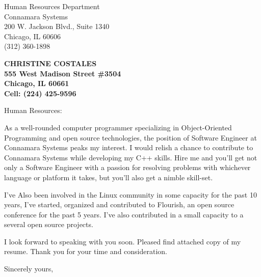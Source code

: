 \documentclass[11pt]{letter} %
\newcommand{\addressee}{Human Resources Department }
\newcommand{\companyName}{Connamara Systems }
\newcommand{\position}{Software Engineer  }
\newcommand{\companyAddress}{ 200 W. Jackson Blvd., Suite 1340 \\
Chicago, IL 60606 \\
(312) 360-1898  }
\newcommand{\myname}{Christine Costales }
\begin{document}
\signature{\myname}                     %
\longindentation=0pt                       %
\let\raggedleft\raggedright                %
 
\begin{letter}{\addressee \\
\companyName \\
\companyAddress
 }

\begin{center}
\large\bf CHRISTINE COSTALES\\
555 West Madison Street \#3504 \\ Chicago, IL 60661 \\ Cell: (224) 425-9596
\end{center} 
\vfill %



\opening{Human Resources:\newline } 


\noindent As a well-rounded computer programmer specializing in Object-Oriented Programming and open source technologies, the position of \position at \companyName peaks my interest. I would relish a chance to contribute to \companyName while developing my C++ skills. Hire me and you’ll get not only a \position with a passion for resolving problems with whichever language or platform it takes, but you’ll also get a nimble skill-set.  \newline


\noindent I've Also been involved in the Linux community in some capacity for the past 10 years, I've started, organized and contributed to Flourish, an open source conference for the past 5 years.  I've also contributed in a small capacity to a several open source projects. \newline 


\noindent I look forward to speaking with you soon. Pleased find attached copy of my resume. Thank you for your time and consideration.  \newline  \newline  \newline    \newline  



\closing{Sincerely yours,}
\end{letter}
 
\end{document}
